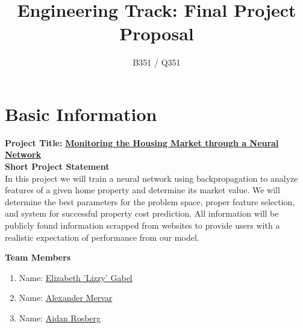 \documentclass[]{article}
\title{\vspace{-2.5cm}Engineering Track: Final Project Proposal}
\author{B351 / Q351}
\date{}
\begin{document}
\maketitle

\section*{Basic Information}

\begin{multicols}{2}
	
\textbf{Project Title:} \underline{\textbf{Monitoring the Housing Market through a Neural Network}}\\

\vspace{0.25cm}
\textbf{Short Project Statement}\\
In this project we will train a neural network using backpropagation to analyze features of a given home property and determine its market value.  We will determine the best parameters for the problem space, proper feature selection, and system for successful property cost prediction.  All information will be publicly found information scrapped from websites to provide users with a realistic expectation of performance from our model.

\columnbreak
\textbf{Team Members}
\begin{enumerate}
	
	\vspace{0.5cm}
	\item Name: \underline{Elizabeth 'Lizzy' Gabel}
	
	\vspace{1cm}
	\item Name: \underline{Alexander Mervar}
	
	\vspace{1cm}
	\item Name: \underline{Aidan Rosberg}
	
	
\end{enumerate}

\end{multicols}
\end{document}
